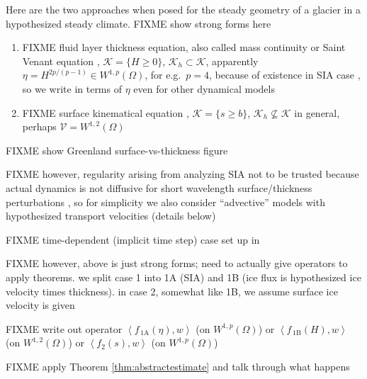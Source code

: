\documentclass[hidelinks,onefignum,onetabnum,final]{siamart220329}  %
\newcommand{\cK}{\mathcal{K}}
\newcommand{\cV}{\mathcal{V}}
\newcommand{\ip}[2]{\left<#1,#2\right>}
\begin{document}
Here are the two approaches when posed for the steady geometry of a glacier in a hypothesized steady climate.  FIXME show strong forms here

\begin{enumerate}
\item FIXME fluid layer thickness equation, also called mass continuity or Saint Venant equation \cite{JouvetBueler2012}, $\cK = \{H\ge 0\}$, $\cK_h \subset \cK$, apparently $\eta = H^{2p/(p-1)} \in W^{1,p}(\Omega)$, for e.g.~$p=4$, because of existence in SIA case \cite{JouvetBueler2012}, so we write in terms of $\eta$ even for other dynamical models
\item FIXME surface kinematical equation \cite{GreveBlatter2009}, $\cK = \{s\ge b\}$, $\cK_h \nsubseteq \cK$ in general, perhaps $\cV = W^{1,2}(\Omega)$
\end{enumerate}

FIXME show Greenland surface-vs-thickness figure

FIXME however, regularity arising from analyzing SIA not to be trusted because actual dynamics is not diffusive for short wavelength surface/thickness perturbations \cite{Pattynetal2008}, so for simplicity we also consider ``advective'' models with hypothesized transport velocities (details below)

FIXME time-dependent (implicit time step) case set up in \cite{Bueler2021conservation}

FIXME however, above is just strong forms; need to actually give operators to apply theorems.  we split case 1 into 1A (SIA) and 1B (ice flux is hypothesized ice velocity times thickness).  in case 2, somewhat like 1B, we assume surface ice velocity is given

\newcommand{\foneA}{f_{\,\text{1A}}}
\newcommand{\foneB}{f_{\,\text{1B}}}

FIXME write out operator $\ip{\foneA(\eta)}{w}$ (on $W^{1,p}(\Omega)$) or $\ip{\foneB(H)}{w}$ (on $W^{1,2}(\Omega)$) or $\ip{f_2(s)}{w}$  (on $W^{1,p}(\Omega)$)

FIXME apply Theorem \ref{thm:abstractestimate} and talk through what happens




\end{document}
